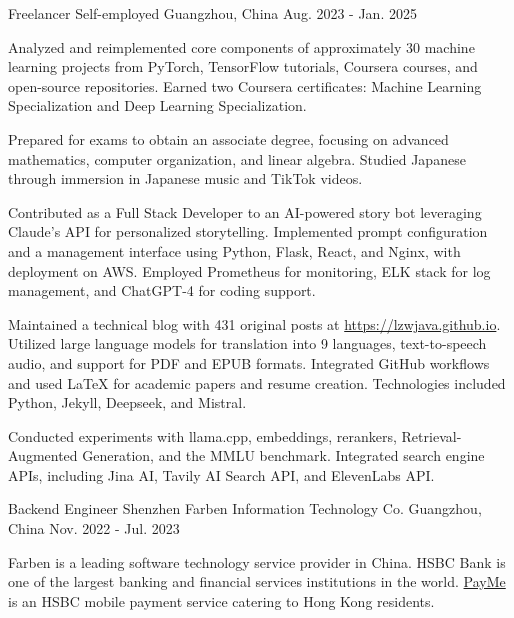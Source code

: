 \begin{cventries}
  \cventry
    {Freelancer} %
    {Self-employed} %
    {Guangzhou, China} %
    {Aug. 2023 - Jan. 2025} %
    {
      \begin{cvitems} %
        \item {Analyzed and reimplemented core components of approximately 30 machine learning projects from PyTorch, TensorFlow tutorials, Coursera courses, and open-source repositories. Earned two Coursera certificates: Machine Learning Specialization and Deep Learning Specialization.}
        \item {Prepared for exams to obtain an associate degree, focusing on advanced mathematics, computer organization, and linear algebra. Studied Japanese through immersion in Japanese music and TikTok videos.}
        \item {Contributed as a Full Stack Developer to an AI-powered story bot leveraging Claude's API for personalized storytelling. Implemented prompt configuration and a management interface using Python, Flask, React, and Nginx, with deployment on AWS. Employed Prometheus for monitoring, ELK stack for log management, and ChatGPT-4 for coding support.}
        \item {Maintained a technical blog with 431 original posts at \url{https://lzwjava.github.io}. Utilized large language models for translation into 9 languages, text-to-speech audio, and support for PDF and EPUB formats. Integrated GitHub workflows and used LaTeX for academic papers and resume creation. Technologies included Python, Jekyll, Deepseek, and Mistral.}
        \item {Conducted experiments with llama.cpp, embeddings, rerankers, Retrieval-Augmented Generation, and the MMLU benchmark. Integrated search engine APIs, including Jina AI, Tavily AI Search API, and ElevenLabs API.}
      \end{cvitems}
    }
  \cventry
    {Backend Engineer} %
    {Shenzhen Farben Information Technology Co.} %
    {Guangzhou, China} %
    {Nov. 2022 - Jul. 2023} %
    {
      \begin{cvitems} %
        \item {Farben is a leading software technology service provider in China. HSBC Bank is one of the largest banking and financial services institutions in the world. \href{https://payme.hsbc.com.hk/}{PayMe} is an HSBC mobile payment service catering to Hong Kong residents.}

\end{cvitems}}
\end{cventries}
